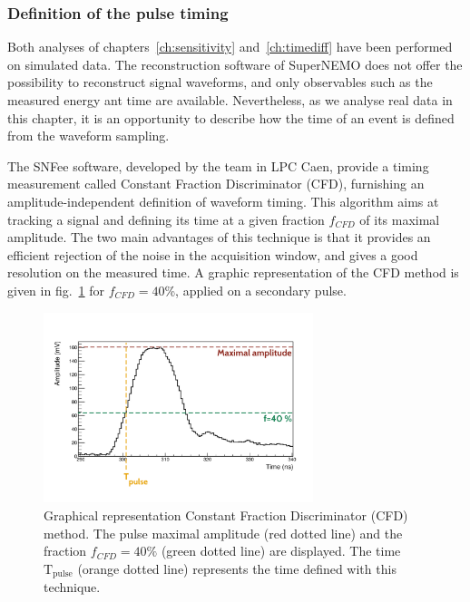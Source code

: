 \subsubsection*{Definition of the pulse timing}

Both analyses of chapters~\ref{ch:sensitivity} and~\ref{ch:timediff} have been performed on simulated data.
The reconstruction software of SuperNEMO does not offer the possibility to reconstruct signal waveforms, and only observables such as the measured energy ant time are available.
Nevertheless, as we analyse real data in this chapter, it is an opportunity to describe how the time of an event is defined from the waveform sampling.

The SNFee software, developed by the team in LPC Caen, provide a timing measurement called Constant Fraction Discriminator (CFD), furnishing an amplitude-independent definition of waveform timing.
This algorithm aims at tracking a signal and defining its time at a given fraction $f_{CFD}$ of its maximal amplitude.
The two main advantages of this technique is that it provides an efficient rejection of the noise in the acquisition window, and gives a good resolution on the measured time.
A graphic representation of the CFD method is given in fig.~\ref{fig:CFD} for $f_{CFD}=40$\%, applied on a secondary pulse.
\begin{figure}[h!]
  \centering
  \includegraphics[trim={1.2cm 1.5cm 1.7cm 3.1cm},clip,width=0.7\textwidth]{commissioning/fig_commissioning/CFD_example_zoom.pdf}
  \caption{Graphical representation Constant Fraction Discriminator (CFD) method.
    The pulse maximal amplitude (red dotted line) and the fraction $f_{CFD}=40\%$ (green dotted line) are displayed.
    The time $\text{T}_{\text{pulse}}$ (orange dotted line) represents the time defined with this technique.
    \label{fig:CFD}}
\end{figure}

